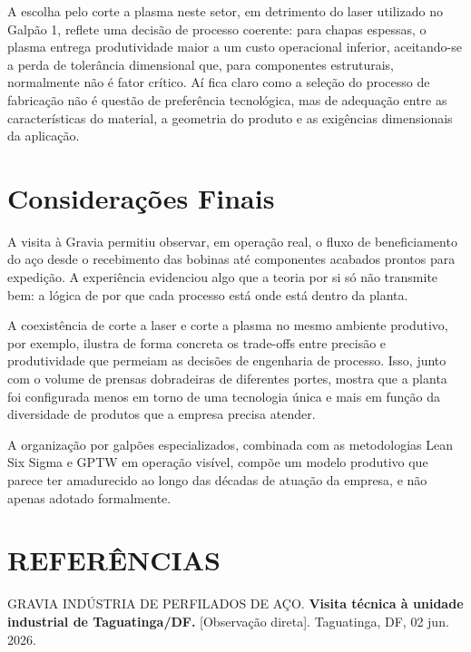 \documentclass[12pt,a4paper,oneside,brazil,chapter=TITLE]{article}
\newcommand{\secbreak}{\clearpage}
\let\oldsection\section
\renewcommand{\section}{\secbreak\oldsection}
\begin{document}
A escolha pelo corte a plasma neste setor, em detrimento do laser utilizado no Galpão 1, reflete uma decisão de processo coerente: para chapas espessas, o plasma entrega produtividade maior a um custo operacional inferior, aceitando-se a perda de tolerância dimensional que, para componentes estruturais, normalmente não é fator crítico. Aí fica claro como a seleção do processo de fabricação não é questão de preferência tecnológica, mas de adequação entre as características do material, a geometria do produto e as exigências dimensionais da aplicação.

\section{Considerações Finais}

A visita à Gravia permitiu observar, em operação real, o fluxo de beneficiamento do aço desde o recebimento das bobinas até componentes acabados prontos para expedição. A experiência evidenciou algo que a teoria por si só não transmite bem: a lógica de por que cada processo está onde está dentro da planta.

A coexistência de corte a laser e corte a plasma no mesmo ambiente produtivo, por exemplo, ilustra de forma concreta os trade-offs entre precisão e produtividade que permeiam as decisões de engenharia de processo. Isso, junto com o volume de prensas dobradeiras de diferentes portes, mostra que a planta foi configurada menos em torno de uma tecnologia única e mais em função da diversidade de produtos que a empresa precisa atender.

A organização por galpões especializados, combinada com as metodologias Lean Six Sigma e GPTW em operação visível, compõe um modelo produtivo que parece ter amadurecido ao longo das décadas de atuação da empresa, e não apenas adotado formalmente.

\section{REFERÊNCIAS}\label{referencias}

\noindent GRAVIA INDÚSTRIA DE PERFILADOS DE AÇO. \textbf{Visita técnica à unidade industrial de Taguatinga/DF.} [Observação direta]. Taguatinga, DF, 02 jun. 2026.
\end{document}
